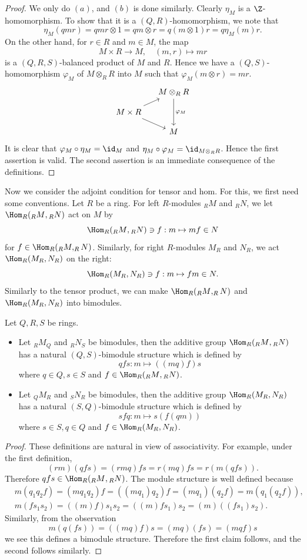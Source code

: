 \begin{proof}
We only do $(a)$, and $(b)$ is done similarly. Clearly $\eta_M$ is a $\Z$-homomorphism. To show that it is a $(Q,R)$-homomorphism, we note that
\[\eta_M(qmr)=qmr\otimes 1=qm\otimes r=q(m\otimes 1)r=q\eta_M(m)r.\]
On the other hand, for $r\in R$ and $m\in M$, the map
\[M\times R\to M,\quad (m,r)\mapsto mr\]
is a $(Q,R,S)$-balanced product of $M$ and $R$. Hence we have a $(Q,S)$-homomorphism $\varphi_M$ of $M\otimes_RR$ into $M$ such that $\varphi_M(m\otimes r)=mr$.
\[\begin{tikzcd}[column sep=small, row sep=small]
&M\otimes_{R}R\ar[dd,"\varphi_M"]\\
M\times R\ar[rd,swap]\ar[ru]&\\
&M
\end{tikzcd}\]
It is clear that $\varphi_M\circ\eta_M=\id_M$ and $\eta_M\circ\varphi_M=\id_{M\otimes_RR}$. Hence the first assertion is valid. The second assertion is an immediate consequence of the definitions.\end{proof}
Now we consider the adjoint condition for tensor and hom. For this, we first need some conventions. Let $R$ be a ring. For left $R$-modules $_{R}M$ and $_{R}N$, we let $\Hom_R({_{R}M},{_{R}N})$ act on $M$ by
\[\Hom_R({_{R}M},{_{R}N})\ni f:m\mapsto mf\in N\]
for $f\in\Hom_R(_{R}M,_{R}N)$. Similarly, for right $R$-modules $M_{R}$ and $N_{R}$, we act $\Hom_R(M_{R},N_{R})$ on the right:
\[\Hom_R(M_{R},N_{R})\ni f:m\mapsto fm\in N.\]
Similarly to the tensor product, we can make $\Hom_R({_{R}M},_{R}N)$ and $\Hom_R(M_{R},N_{R})$ into bimodules.
\begin{proposition}\label{bimodule Hom set is bimodule}
Let $Q,R,S$ be rings.
\begin{itemize}
\item Let $_{R}M_{Q}$ and $_{R}N_{S}$ be bimodules, then the additive group $\Hom_{R}({_{R}M},{_{R}N})$ has a natural $(Q,S)$-bimodule structure which is defined by
\[qfs:m\mapsto((mq)f)s\]
where $q\in Q,s\in S$ and $f\in\Hom_{R}({_{R}M},{_{R}N})$.
\item Let $_{Q}M_{R}$ and $_{S}N_{R}$ be bimodules, then the additive group $\Hom_{R}({M_{R}},{N_{R}})$ has a natural $(S,Q)$-bimodule structure which is defined by
\[sfq:m\mapsto s(f(qm))\]
where $s\in S,q\in Q$ and $f\in\Hom_{R}({M_{R}},{N_{R}})$.
\end{itemize}
\end{proposition}
\begin{proof}
These definitions are natural in view of associativity. For example, under the first definition,
\[(rm)(qfs)=(rmq)fs=r(mq)fs=r(m(qfs)).\]
Therefore $qfs\in\Hom_{R}({_{R}M},{_{R}N})$. The module structure is well defined because
\begin{align*}
&m(q_1q_2f)=(mq_1q_2)f=((mq_1)q_2)f=(mq_1)(q_2f)=m(q_1(q_2f)),\\
&m(fs_1s_2)=((m)f)s_1s_2=((m)fs_1)s_2=(m)((fs_1)s_2).
\end{align*}
Similarly, from the observation
\[m(q(fs))=((mq)f)s=(mq)(fs)=(mqf)s\]
we see this defines a bimodule structure. Therefore the first claim follows, and the second follows similarly. 
\end{proof}
